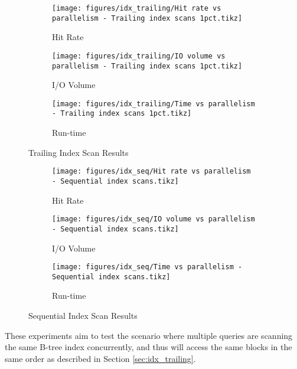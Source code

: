 \begin{figure*}
    \begin{subfigure}{\textwidth}
        \centering
        \texttt{[image: figures/idx\_trailing/Hit rate vs parallelism - Trailing index scans 1pct.tikz]}
        \caption{Hit Rate}
        \label{fig:idx_trailing_hitrate}
    \end{subfigure}
    \begin{subfigure}{\textwidth}
        \centering
        \texttt{[image: figures/idx\_trailing/IO volume vs parallelism - Trailing index scans 1pct.tikz]}
        \caption{I/O Volume}
        \label{fig:idx_trailing_iovol}
    \end{subfigure}
    \begin{subfigure}{\textwidth}
        \centering
        \texttt{[image: figures/idx\_trailing/Time vs parallelism - Trailing index scans 1pct.tikz]}
        \caption{Run-time}
        \label{fig:idx_trailing_runtime}
    \end{subfigure}
    \caption{Trailing Index Scan Results}
    \label{fig:idx_trailing}
\end{figure*}

\begin{figure*}
    \begin{subfigure}{\textwidth}
        \centering
        \texttt{[image: figures/idx\_seq/Hit rate vs parallelism - Sequential index scans.tikz]}
        \caption{Hit Rate}
    \end{subfigure}
    \begin{subfigure}{\textwidth}
        \centering
        \texttt{[image: figures/idx\_seq/IO volume vs parallelism - Sequential index scans.tikz]}
        \caption{I/O Volume}
    \end{subfigure}
    \begin{subfigure}{\textwidth}
        \centering
        \texttt{[image: figures/idx\_seq/Time vs parallelism - Sequential index scans.tikz]}
        \caption{Run-time}
    \end{subfigure}

    \caption{Sequential Index Scan Results}
    \label{fig:idx_seq}
\end{figure*}

These experiments aim to test the scenario where multiple queries are scanning the same B-tree index concurrently, and thus will access the same blocks in the same order as described in Section \ref{sec:idx_trailing}.

